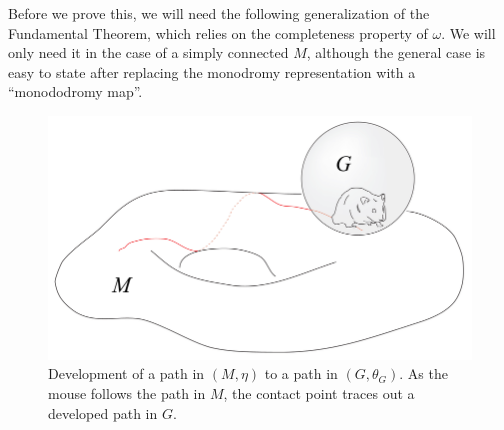 Before we prove this, we will need the following generalization of the Fundamental Theorem, which relies on the completeness property of $\omega$. We will only need it in the case of a simply connected $M$, although the general case is easy to state after replacing the monodromy representation with a ``monododromy map''.

\begin{figure}[tp]
    \centering
    \includegraphics[scale=0.2]{figures/development.png}
    \caption{Development of a path in $(M,\eta)$ to a path in $(G,\theta_G)$. As the mouse follows the path in $M$, the contact point traces out a developed path in $G$.}
    \label{fig:development} 
\end{figure}


